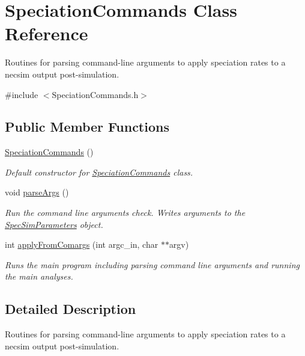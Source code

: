 \hypertarget{class_speciation_commands}{}\section{Speciation\+Commands Class Reference}
\label{class_speciation_commands}


Routines for parsing command-\/line arguments to apply speciation rates to a necsim output post-\/simulation.  




{\ttfamily \#include $<$Speciation\+Commands.\+h$>$}

\subsection*{Public Member Functions}
\begin{DoxyCompactItemize}
\item 
\hyperlink{class_speciation_commands_a6e693fcd81d61fd8d4c04af39f851e49}{Speciation\+Commands} ()\hypertarget{class_speciation_commands_a6e693fcd81d61fd8d4c04af39f851e49}{}\label{class_speciation_commands_a6e693fcd81d61fd8d4c04af39f851e49}

\begin{DoxyCompactList}\small\item\em Default constructor for \hyperlink{class_speciation_commands}{Speciation\+Commands} class. \end{DoxyCompactList}\item 
void \hyperlink{class_speciation_commands_a691dfe450b005f1fa50e1e6fc0027db7}{parse\+Args} ()
\begin{DoxyCompactList}\small\item\em Run the command line arguments check. Writes arguments to the \hyperlink{struct_spec_sim_parameters}{Spec\+Sim\+Parameters} object. \end{DoxyCompactList}\item 
int \hyperlink{class_speciation_commands_a2ac0cf0a39c9c88b76d88c1d5d65f01a}{apply\+From\+Comargs} (int argc\+\_\+in, char $\ast$$\ast$argv)
\begin{DoxyCompactList}\small\item\em Runs the main program including parsing command line arguments and running the main analyses. \end{DoxyCompactList}\end{DoxyCompactItemize}


\subsection{Detailed Description}
Routines for parsing command-\/line arguments to apply speciation rates to a necsim output post-\/simulation. 


